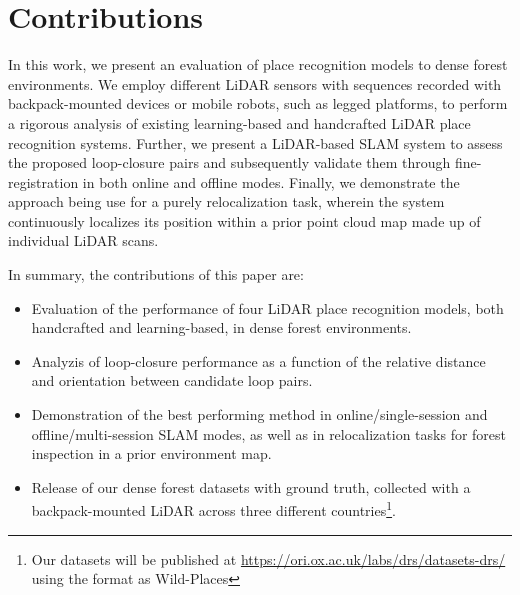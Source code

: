 \section{Contributions}

In this work, we present an evaluation of place recognition models to dense forest environments. We employ different LiDAR sensors with sequences recorded with backpack-mounted devices or mobile robots, such as legged platforms, to perform a rigorous analysis of existing learning-based and handcrafted LiDAR place recognition systems. Further, we present a LiDAR-based SLAM system to assess the proposed loop-closure pairs and subsequently validate them through fine-registration in both online and offline modes. Finally, we demonstrate the approach being use for a purely relocalization task, wherein the system continuously localizes its position within a prior point cloud map made up of individual LiDAR scans.



In summary, the contributions of this paper are:
\begin{itemize}

\item Evaluation of the performance of four LiDAR place recognition models, both handcrafted and learning-based, in dense forest environments.

\item Analyzis of loop-closure performance as a function of the relative distance and orientation between candidate loop pairs.

\item Demonstration of the best performing method in online/single-session and offline/multi-session SLAM modes, as well as in relocalization tasks for forest inspection in a prior environment map. 

\item Release of our dense forest datasets with ground truth, collected with a backpack-mounted LiDAR across three different countries\footnote{Our datasets will be published at \url{https://ori.ox.ac.uk/labs/drs/datasets-drs/} using the format as Wild-Places}. 
\end{itemize}






